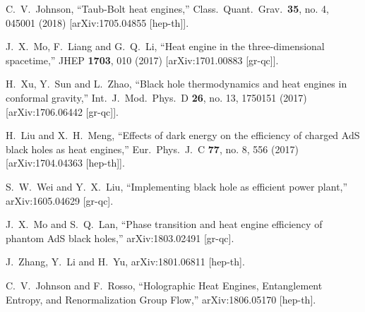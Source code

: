 \documentclass[preprint,showpacs,showkeys,onecolumn,nofootinbib]{revtex4}
\begin{document}
\begin{thebibliography}{99}
  C.~V.~Johnson,
  ``Taub-Bolt heat engines,''
  Class.\ Quant.\ Grav.\  {\bf 35}, no. 4, 045001 (2018)
  [arXiv:1705.04855 [hep-th]].


  J.~X.~Mo, F.~Liang and G.~Q.~Li,
  ``Heat engine in the three-dimensional spacetime,''
  JHEP {\bf 1703}, 010 (2017)
  [arXiv:1701.00883 [gr-qc]].

  H.~Xu, Y.~Sun and L.~Zhao,
  ``Black hole thermodynamics and heat engines in conformal gravity,''
  Int.\ J.\ Mod.\ Phys.\ D {\bf 26}, no. 13, 1750151 (2017)
  [arXiv:1706.06442 [gr-qc]].


  H.~Liu and X.~H.~Meng,
  ``Effects of dark energy on the efficiency of charged AdS black holes as heat engines,''
  Eur.\ Phys.\ J.\ C {\bf 77}, no. 8, 556 (2017)
  [arXiv:1704.04363 [hep-th]].

  S.~W.~Wei and Y.~X.~Liu,
  ``Implementing black hole as efficient power plant,''
  arXiv:1605.04629 [gr-qc].


  J.~X.~Mo and S.~Q.~Lan,
  ``Phase transition and heat engine efficiency of phantom AdS black holes,''
  arXiv:1803.02491 [gr-qc].

  J.~Zhang, Y.~Li and H.~Yu,
  arXiv:1801.06811 [hep-th].




  C.~V.~Johnson and F.~Rosso,
  ``Holographic Heat Engines, Entanglement Entropy, and Renormalization Group Flow,''
  arXiv:1806.05170 [hep-th].



\end{thebibliography}
\end{document}

